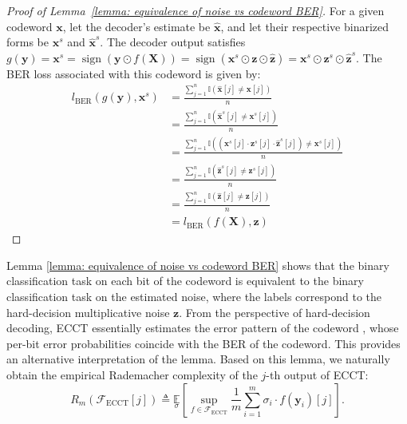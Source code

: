 \documentclass[lettersize,onecolumn]{IEEEtran}
\begin{document}
\begin{proof}[Proof of Lemma~\ref{lemma: equivalence of noise vs codeword BER}]
For a given codeword $\mathbf{x}$, let the decoder’s estimate be $\hat{\mathbf{x}}$, and let their respective binarized forms be $\mathbf{x}^{s}$ and $\hat{\mathbf{x}}^{s}$. The decoder output satisfies $g(\mathbf{y})=\mathbf{x}^{s}=\operatorname{sign}(\mathbf{y}\odot f(\mathbf{X}))=\operatorname{sign}(\mathbf{x}^{s}\odot\mathbf{z}\odot\hat{\mathbf{z}})=\mathbf{x}^{s}\odot\mathbf{z}^{s}\odot\hat{\mathbf{z}}^{s}$. 
The BER loss associated with this codeword is given by: 
    \begin{equation}
    \begin{aligned}
        l_{\text{BER}}(g(\mathbf{y}),\mathbf{x}^{s}) &= \frac{\sum_{j=1}^{n}\mathbb{I}(\hat{\mathbf{x}}[j]\neq \mathbf{x}[j])}{n} \\
        &= \frac{\sum_{j=1}^{n}\mathbb{I}(\hat{\mathbf{x}}^{s}[j]\neq \mathbf{x}^{s}[j])}{n} \\
        &= \frac{\sum_{j=1}^{n}\mathbb{I}((\mathbf{x}^{s}[j]\cdot\mathbf{z}^{s}[j]\cdot\hat{\mathbf{z}}^{s}[j])\neq \mathbf{x}^{s}[j])}{n} \\
        &= \frac{\sum_{j=1}^{n}\mathbb{I}(\hat{\mathbf{z}}^{s}[j]\neq \mathbf{z}^{s}[j])}{n} \\
        &= \frac{\sum_{j=1}^{n}\mathbb{I}(\hat{\mathbf{z}}[j]\neq \mathbf{z}[j])}{n} \\
        &= l_{\text{BER}}(f(\mathbf{X}), \mathbf{z})
    \end{aligned}
    \end{equation}
\end{proof}

Lemma \ref{lemma: equivalence of noise vs codeword BER} shows that the binary classification task on each bit of the codeword is equivalent to the binary classification task on the estimated noise, where the labels correspond to the hard-decision multiplicative noise $\mathbf{z}$. From the perspective of hard-decision decoding, ECCT essentially estimates the error pattern of the codeword \cite{ryan2009channel}, whose per-bit error probabilities coincide with the BER of the codeword. This provides an alternative interpretation of the lemma. Based on this lemma, we naturally obtain the empirical Rademacher complexity of the $j$-th output of ECCT:
\begin{equation}
        R_{m}\left(\mathcal{F}_{\text{ECCT}}[j]\right) \triangleq \underset{\sigma}{\mathbb{E}}\left[\sup _{f \in \mathcal{F}_{\text{ECCT}}} \frac{1}{m} \sum_{i=1}^{m} \sigma_{i} \cdot f\left(\mathbf{y}_{i}\right)[j]\right].
        \label{def: noise bit-wise Rad complexity}
\end{equation}
\end{document}

